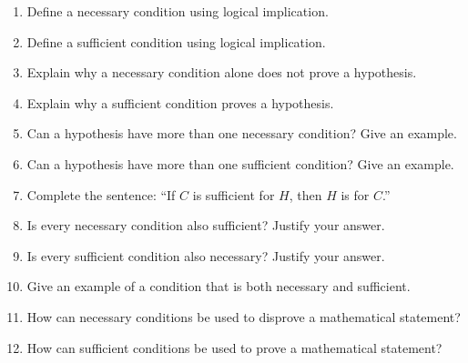 \documentclass{essay}
\begin{document}
\begin{enumerate}
  \item Define a necessary condition using logical implication.
  \item Define a sufficient condition using logical implication.
  \item Explain why a necessary condition alone does not prove a hypothesis.
  \item Explain why a sufficient condition proves a hypothesis.
  \item Can a hypothesis have more than one necessary condition? Give an example.
  \item Can a hypothesis have more than one sufficient condition? Give an example.
  \item Complete the sentence: ``If \(C\) is sufficient for \(H\), then \(H\) is \underline{\hspace{2cm}} for \(C\).''
  \item Is every necessary condition also sufficient? Justify your answer.
  \item Is every sufficient condition also necessary? Justify your answer.
  \item Give an example of a condition that is both necessary and sufficient.
  \item How can necessary conditions be used to disprove a mathematical statement?
  \item How can sufficient conditions be used to prove a mathematical statement?
\end{enumerate}
\end{document}
